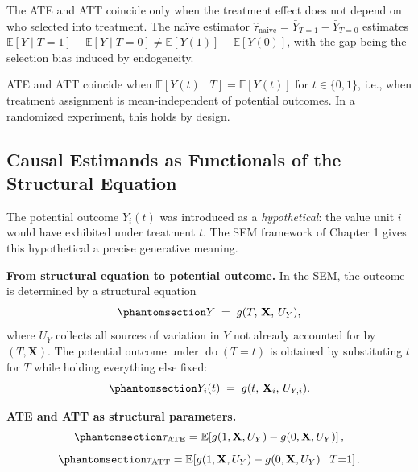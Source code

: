 \documentclass[
  a4paper,
]{book}
\newcommand{\doop}{\operatorname{do}}
\newcommand{\E}{\mathbb{E}}
\begin{document}
The ATE and ATT coincide only when the treatment effect does not depend
on who selected into treatment. The naïve estimator
\(\hat\tau_{\mathrm{naive}} = \bar{Y}_{T=1} - \bar{Y}_{T=0}\) estimates
\(\E[Y \mid T{=}1] - \E[Y \mid T{=}0] \neq \E[Y(1)] - \E[Y(0)]\), with
the gap being the selection bias induced by endogeneity.

\begin{tcolorbox}[enhanced jigsaw, arc=.35mm, bottomrule=.15mm, bottomtitle=1mm, breakable, colback=white, colbacktitle=quarto-callout-note-color!10!white, colframe=quarto-callout-note-color-frame, coltitle=black, left=2mm, leftrule=.75mm, opacityback=0, opacitybacktitle=0.6, rightrule=.15mm, title={Remark}, titlerule=0mm, toprule=.15mm, toptitle=1mm]

ATE and ATT coincide when \(\E[Y(t) \mid T] = \E[Y(t)]\) for
\(t \in \{0,1\}\), i.e., when treatment assignment is mean-independent
of potential outcomes. In a randomized experiment, this holds by design.

\end{tcolorbox}

\subsection{Causal Estimands as Functionals of the Structural
Equation}\label{sec-sem-po}

The potential outcome \(Y_i(t)\) was introduced as a
\emph{hypothetical}: the value unit \(i\) would have exhibited under
treatment \(t\). The SEM framework of Chapter 1 gives this hypothetical
a precise generative meaning.

\textbf{From structural equation to potential outcome.} In the SEM, the
outcome is determined by a structural equation
\begin{equation}\protect\phantomsection\label{eq-sem-y}{Y \;=\; g(T,\, \mathbf{X},\, U_Y),}\end{equation}
where \(U_Y\) collects all sources of variation in \(Y\) not already
accounted for by \((T, \mathbf{X})\). The potential outcome under
\(\doop(T{=}t)\) is obtained by substituting \(t\) for \(T\) while
holding everything else fixed:
\begin{equation}\protect\phantomsection\label{eq-po-from-sem}{Y_i(t) \;=\; g(t,\, \mathbf{X}_i,\, U_{Y,i}).}\end{equation}

\textbf{ATE and ATT as structural parameters.}
\begin{equation}\protect\phantomsection\label{eq-ate-sem}{\tau_{\mathrm{ATE}} = \E\!\left[g(1, \mathbf{X}, U_Y) - g(0, \mathbf{X}, U_Y)\right],}\end{equation}
\begin{equation}\protect\phantomsection\label{eq-att-sem}{\tau_{\mathrm{ATT}} = \E\!\left[g(1, \mathbf{X}, U_Y) - g(0, \mathbf{X}, U_Y) \mid T{=}1\right].}\end{equation}
\end{document}
